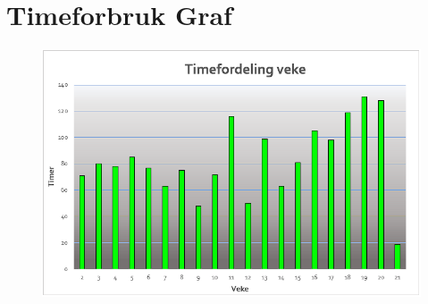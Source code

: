 \section{Timeforbruk Graf}
\begin{figure}[htbp]
    \thispagestyle{fancy}
    \centering
    \includegraphics[width=\textwidth]{Vedlegg/TimelisteGraf.png}
\end{figure}










